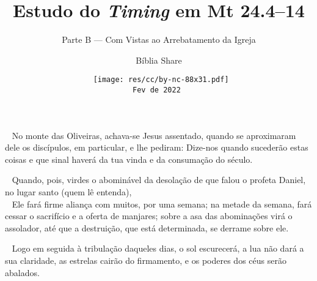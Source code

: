 \documentclass[12pt,aspectratio=169]{beamer}
\title{Estudo do \textit{Timing} em Mt 24.4--14}
\subtitle{Parte B --- Com Vistas ao Arrebatamento da Igreja}
\author{Bíblia Share}
\date[{\tiny\tt{Fev de 2022}}]{{\scriptsize\tt%
    \texttt{[image: res/cc/by-nc-88x31.pdf]}\\[\smallskipamount]
    Fev de 2022%
}}
\newcommand{\ver}[1]{%
    \raisebox{0.50ex}{%
        \scalebox{1.1}{%
            \pmb{\textbf{\textcolor{BSpbg}{#1}}}%
        }%
    }%
}
\newcommand{\QUOTE}[1]{%
    \par\noindent\hspace*{0.1\linewidth}%
    \begin{minipage}{0.8\linewidth}%
        \linespread{1.35}\large{#1}%
    \end{minipage}%
}
\newcommand{\RED}[1]{{\textcolor{TXred}{#1}}}
\newcommand{\YEL}[1]{{\textcolor{TXyel}{#1}}}
\newcommand{\GRE}[1]{{\textcolor{TXgre}{#1}}}
\newcommand{\CYA}[1]{{\textcolor{TXcya}{#1}}}
\newcommand{\MAG}[1]{{\textcolor{TXmag}{#1}}}
\newcommand{\BRI}[1]{{\textcolor{BSpbg}{#1}}}   %
\begin{document}
\begin{frame}
    \titlepage
\end{frame}

    \begin{frame}
        \QUOTE{%
            \ver{(ARA) Mt~24.3}~%
            No monte das Oliveiras, achava-se Jesus assentado, quando se aproximaram dele os
            discípulos, \BRI{em particular}, e lhe pediram: Dize-nos  \YEL{quando  sucederão
            estas coisas} e \GRE{que sinal haverá da tua  vinda}  e  da  \MAG{consumação  do
            século}.
        }
    \end{frame}

    \begin{frame}
        \QUOTE{%
            \ver{(ARA) Mt~24.15}~%
            \YEL{Quando}, pois, virdes \GRE{o  abominável  da  desolação}  de  que  falou  o
            \MAG{profeta Daniel}, no lugar santo (quem lê entenda), \\[\bigskipamount]
            \ver{(ARA) Dn~9.27}~%
            Ele fará firme aliança com muitos, por uma semana; \YEL{na  metade  da  semana},
            fará cessar  o  sacrifício  e  a  oferta  de  manjares;  sobre  a  \GRE{asa  das
            abominações virá o assolador}, até que a destruição, que  está  determinada,  se
            derrame sobre ele.
        }
    \end{frame}

    \begin{frame}
        \QUOTE{%
            \ver{(ARA) Mt~24.29}~%
            Logo em seguida à tribulação daqueles dias, o \YEL{sol escurecerá},  a  \RED{lua
            não dará a  sua  claridade},  as  \GRE{estrelas  cairão  do  firmamento},  e  os
            \CYA{poderes dos céus serão abalados}.
        }
    \end{frame}
\end{document}

